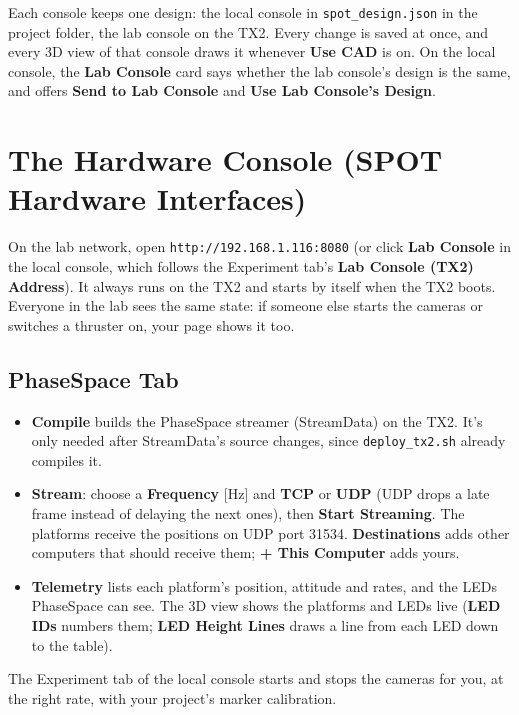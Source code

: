 \documentclass[11pt,a4paper]{article}
\newcommand{\ui}[1]{\textsf{\textbf{#1}}}
\newcommand{\pth}[1]{\texttt{#1}}
\begin{document}
Each console keeps one design: the local console in \pth{spot\_design.json} in the project folder, the lab console
on the TX2. Every change is saved at once, and every 3D view of that console draws it whenever \ui{Use CAD} is on.
On the local console, the \ui{Lab Console} card says whether the lab console's design is the same, and offers
\ui{Send to Lab Console} and \ui{Use Lab Console's Design}.

\section{The Hardware Console (SPOT Hardware Interfaces)}

On the lab network, open \pth{http://192.168.1.116:8080} (or click \ui{Lab Console} in the local console, which follows
the Experiment tab's \ui{Lab Console (TX2) Address}).
It always runs on the TX2 and starts by itself when the TX2 boots. Everyone in the lab sees the same state: if
someone else starts the cameras or switches a thruster on, your page shows it too.

\subsection{PhaseSpace Tab}
\begin{itemize}
  \item \ui{Compile} builds the PhaseSpace streamer (StreamData) on the TX2. It's only needed after StreamData's source
        changes, since \pth{deploy\_tx2.sh} already compiles it.
  \item \ui{Stream}: choose a \ui{Frequency} [Hz] and \ui{TCP} or \ui{UDP} (UDP drops a late frame instead of delaying
        the next ones), then \ui{Start Streaming}. The platforms receive the positions on UDP port 31534.
        \ui{Destinations} adds other computers that should receive them; \ui{+ This Computer} adds yours.
  \item \ui{Telemetry} lists each platform's position, attitude and rates, and the LEDs PhaseSpace can see. The 3D
        view shows the platforms and LEDs live (\ui{LED IDs} numbers them; \ui{LED Height Lines} draws a line from each LED down to the table).
\end{itemize}
The Experiment tab of the local console starts and stops the cameras for you, at the right rate, with your
project's marker calibration.
\end{document}
